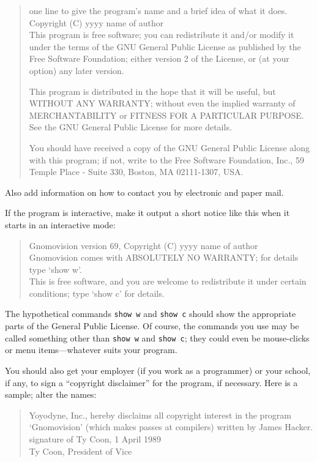 \documentclass[12pt]{report}
\begin{document}
\begin{quote}
one line to give the program's name and a brief idea of what it does. \\
Copyright (C) yyyy  name of author \\

This program is free software; you can redistribute it and/or modify
it under the terms of the GNU General Public License as published by
the Free Software Foundation; either version 2 of the License, or
(at your option) any later version.

This program is distributed in the hope that it will be useful,
but WITHOUT ANY WARRANTY; without even the implied warranty of
MERCHANTABILITY or FITNESS FOR A PARTICULAR PURPOSE.  See the
GNU General Public License for more details.

You should have received a copy of the GNU General Public License
along with this program; if not, write to the Free Software
Foundation, Inc., 59 Temple Place - Suite 330, Boston, MA  02111-1307, USA.
\end{quote}

Also add information on how to contact you by electronic and paper mail.

If the program is interactive, make it output a short notice like this
when it starts in an interactive mode:

\begin{quote}
Gnomovision version 69, Copyright (C) yyyy  name of author \\
Gnomovision comes with ABSOLUTELY NO WARRANTY; for details type `show w'. \\
This is free software, and you are welcome to redistribute it
under certain conditions; type `show c' for details.
\end{quote}


The hypothetical commands {\tt show w} and {\tt show c} should show the
appropriate parts of the General Public License.  Of course, the commands
you use may be called something other than {\tt show w} and {\tt show c};
they could even be mouse-clicks or menu items---whatever suits your
program.

You should also get your employer (if you work as a programmer) or your
school, if any, to sign a ``copyright disclaimer'' for the program, if
necessary.  Here is a sample; alter the names:

\begin{quote}
Yoyodyne, Inc., hereby disclaims all copyright interest in the program \\
`Gnomovision' (which makes passes at compilers) written by James Hacker. \\

signature of Ty Coon, 1 April 1989 \\
Ty Coon, President of Vice
\end{quote}
\end{document}
